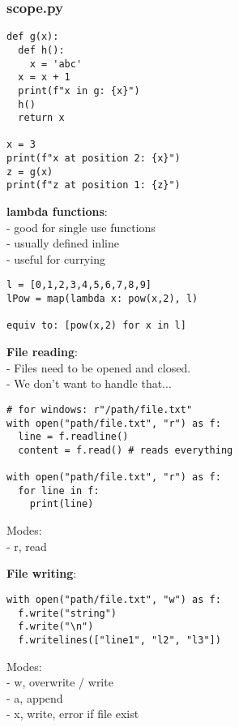 \documentclass{beamer}
\begin{document}
\begin{frame}[fragile]
    \frametitle{scope.py}
    \begin{example}
        \begin{verbatim}
def g(x):
  def h():
    x = 'abc'
  x = x + 1
  print(f"x in g: {x}")
  h()
  return x

x = 3
print(f"x at position 2: {x}")
z = g(x)
print(f"z at position 1: {z}")
        \end{verbatim}
    \end{example}
\end{frame}

\begin{frame}[fragile]
    \textbf{lambda functions}:\\
    - good for single use functions\\
    - usually defined inline\\
    - useful for currying
\begin{example}{}
\begin{verbatim}
l = [0,1,2,3,4,5,6,7,8,9]
lPow = map(lambda x: pow(x,2), l)

equiv to: [pow(x,2) for x in l]

\end{verbatim}
\end{example}
\end{frame}

\begin{frame}[fragile]
    \textbf{File reading}:\\
    - Files need to be opened and closed.\\
    - We don't want to handle that...\\
    \begin{example}
        \begin{verbatim}
# for windows: r"/path/file.txt"
with open("path/file.txt", "r") as f:
  line = f.readline()
  content = f.read() # reads everything

with open("path/file.txt", "r") as f:
  for line in f:
    print(line)
        \end{verbatim}
        Modes:\\
        - r, read\\
    \end{example}
\end{frame}
\begin{frame}[fragile]
    \textbf{File writing}:\\
    \begin{example}
        \begin{verbatim}
with open("path/file.txt", "w") as f:
  f.write("string")
  f.write("\n")
  f.writelines(["line1", "l2", "l3"])
    \end{verbatim}
        Modes:\\
        - w, overwrite / write\\
        - a, append\\
        - x, write, error if file exist
    \end{example}
\end{frame}
\end{document}
